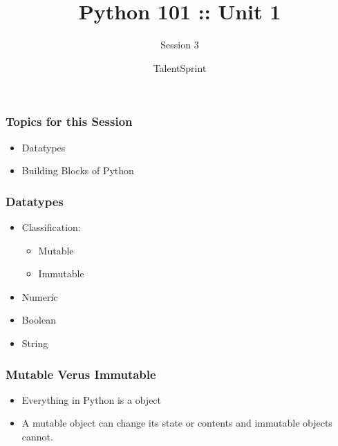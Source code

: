 \documentclass[14pt]{beamer}
\title{Python 101 :: Unit 1}
\subtitle{Session 3}
\date{}
\author[TS]{TalentSprint}
\begin{document}
    \begin{frame}
        \titlepage
    \end{frame}
    \begin{frame}
        \frametitle{Topics for this Session}
        \begin{itemize}
            \item Datatypes
            \item Building Blocks of Python
        \end{itemize}
    \end{frame}
    \begin{frame}
        \frametitle{Datatypes}
        \begin{itemize}
            \item Classification:
                \begin{itemize}
                    \item Mutable
                    \item Immutable
                \end{itemize}
            \item Numeric
            \item Boolean
            \item String
        \end{itemize}
    \end{frame}
    \begin{frame}
        \frametitle{Mutable Verus Immutable}
        \begin{itemize}
            \item Everything in Python is a object
            \item A mutable object can change its state or contents and immutable objects cannot.
        \end{itemize}
    \end{frame}
\end{document}
